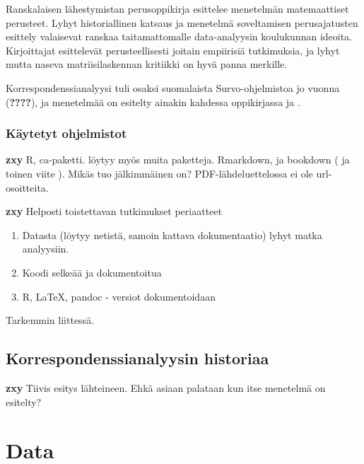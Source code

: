\documentclass[
  finnish,
]{book}
\providecommand{\tightlist}{%
  \setlength{\itemsep}{0pt}\setlength{\parskip}{0pt}}
\begin{document}
Ranskalaisen lähestymistan perusoppikirja\citep{RefWorks:doc:5a857a43e4b0ed2d44664d75} esittelee menetelmän matemaattiset perusteet. Lyhyt historiallinen katsaus ja menetelmä soveltamisen perusajatusten esittely valaisevat ranskaa taitamattomalle data-analyysin koulukunnan ideoita. Kirjoittajat esittelevät perusteellisesti joitain empiirisiä tutkimuksia, ja lyhyt mutta naseva matriisilaskennan kritiikki on hyvä panna merkille.

Korrespondenssianalyysi tuli osaksi suomalaista Survo-ohjelmistoa jo vuonna (\textbf{????}), ja menetelmää on esitelty ainakin kahdessa oppikirjassa\citep{RefWorks:doc:5a857a44e4b0ed2d44664d95} ja \citep{RefWorks:doc:5a857a44e4b0ed2d44664da4}.

\hypertarget{kuxe4ytetyt-ohjelmistot}{%
\subsection{Käytetyt ohjelmistot}\label{kuxe4ytetyt-ohjelmistot}}

\textbf{zxy} R, ca-paketti. löytyy myös muita paketteja. Rmarkdown\citep{RefWorks:doc:5b6b346fe4b0c619b11b8a3e}, ja bookdown (\citep{RefWorks:doc:5b6b36dde4b09b7ec442bf8b} ja toinen viite \citep{R-bookdown}). Mikäs tuo jälkimmäinen on? PDF-lähdeluettelossa ei ole url-osoitteita.

\textbf{zxy} Helposti toistettavan tutkimukset periaatteet

\begin{enumerate}
\def\labelenumi{\arabic{enumi}.}
\tightlist
\item
  Datasta (löytyy netistä, samoin kattava dokumentaatio) lyhyt matka analyysiin.
\item
  Koodi selkeää ja dokumentoitua
\item
  R, LaTeX, pandoc - versiot dokumentoidaan
\end{enumerate}

Tarkemmin liittessä.

\hypertarget{korrespondenssianalyysin-historiaa}{%
\section{Korrespondenssianalyysin historiaa}\label{korrespondenssianalyysin-historiaa}}

\textbf{zxy} Tiivis esitys lähteineen. Ehkä asiaan palataan kun itse menetelmä on esitelty?

\hypertarget{data}{%
\chapter{Data}\label{data}}
\end{document}
